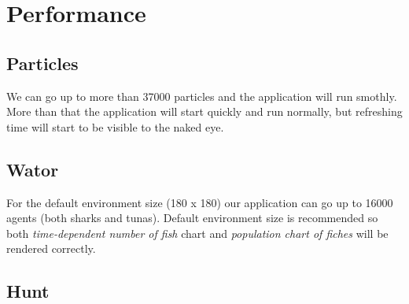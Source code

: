 \section{Performance}
\label{sec:Performance}
\subsection{Particles}
We can go up to more than 37000 particles and the application will run smothly.\\
More than that the application will start quickly and run normally, but refreshing time will start to be visible to the naked eye.

\subsection{Wator}
For the default environment size (180 x 180) our application can go up to 16000 agents (both sharks and tunas). Default environment size is recommended so both \textit{time-dependent number of fish} chart and \textit{population chart of fiches} will be rendered correctly.

\subsection{Hunt}